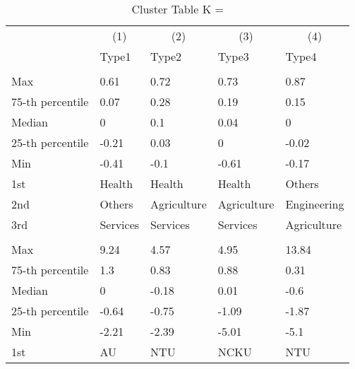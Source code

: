 \begin{table}
\centering
\caption{Cluster Table K = }
\centering
\begin{threeparttable}
\begin{tabular}[t]{lllll}
\toprule
\multicolumn{1}{c}{ } & \multicolumn{1}{c}{(1)} & \multicolumn{1}{c}{(2)} & \multicolumn{1}{c}{(3)} & \multicolumn{1}{c}{(4)} \\
\cmidrule(l{3pt}r{3pt}){2-2} \cmidrule(l{3pt}r{3pt}){3-3} \cmidrule(l{3pt}r{3pt}){4-4} \cmidrule(l{3pt}r{3pt}){5-5}
 & Type1 & Type2 & Type3 & Type4\\
\midrule
\addlinespace[0.3em]
\multicolumn{5}{l}{\textit{\textbf{Panel A: }}}\\
\hspace{1em}Max & 0.61 & 0.72 & 0.73 & 0.87\\
\hspace{1em}75-th percentile & 0.07 & 0.28 & 0.19 & 0.15\\
\hspace{1em}Median & 0 & 0.1 & 0.04 & 0\\
\hspace{1em}25-th percentile & -0.21 & 0.03 & 0 & -0.02\\
\hspace{1em}Min & -0.41 & -0.1 & -0.61 & -0.17\\
\hspace{1em}1st & Health & Health & Health & Others\\
\hspace{1em}2nd & Others & Agriculture & Agriculture & Engineering\\
\hspace{1em}3rd & Services & Services & Services & Agriculture\\
\addlinespace[0.3em]
\multicolumn{5}{l}{\textit{\textbf{Panel B: }}}\\
\hspace{1em}Max & 9.24 & 4.57 & 4.95 & 13.84\\
\hspace{1em}75-th percentile & 1.3 & 0.83 & 0.88 & 0.31\\
\hspace{1em}Median & 0 & -0.18 & 0.01 & -0.6\\
\hspace{1em}25-th percentile & -0.64 & -0.75 & -1.09 & -1.87\\
\hspace{1em}Min & -2.21 & -2.39 & -5.01 & -5.1\\
\hspace{1em}1st & AU & NTU & NCKU & NTU\\

\end{tabular}
\end{threeparttable}
\end{table}
